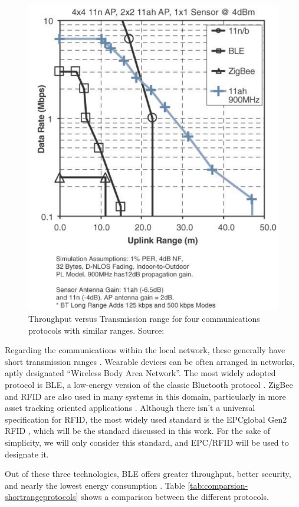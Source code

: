 \begin{figure}[H] 
    \centering
    \includegraphics[width=0.55\linewidth]{images/communication-protocols-throughput.png}
    \caption{Throughput versus Transmission range for four communications protocols with similar ranges. Source: \cite{10.5555/3161403}}
    \label{fig:communication-protocols-throughput}
\end{figure}

Regarding the communications within the local network, these generally have short transmission ranges \cite{Baker2017}. Wearable devices can be often arranged in networks, aptly designated ``Wireless Body Area Network''. The most widely adopted protocol is \acf{BLE}, a low-energy version of the classic Bluetooth protocol \cite{Doukas2012, Wu2019, Wu2020}. ZigBee and \acf{RFID} are also used in many systems in this domain, particularly in more asset tracking oriented applications \cite{Fuhrer2006, Catarinucci2015, Adame2018}. Although there isn't a universal specification for \acs{RFID}, the most widely used standard is the EPCglobal Gen2 RFID \cite{EPCglobal2006}, which will be the standard discussed in this work. For the sake of simplicity, we will only consider this standard, and EPC/\acs{RFID} will be used to designate it. \bigskip

Out of these three technologies, \acs{BLE} offers greater throughput, better security, and nearly the lowest energy consumption \cite{dementyev2013power}. Table \ref{tab:comparsion-shortrangeprotocols} shows a comparison between the different protocols.

